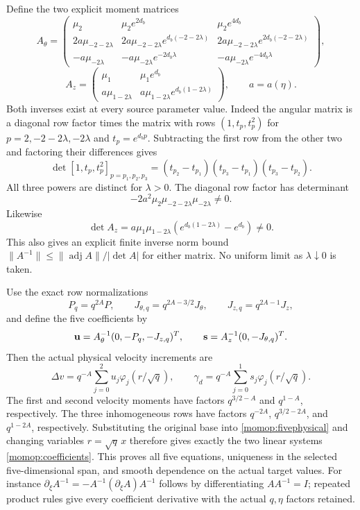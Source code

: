\documentclass[11pt]{article}
\begin{document}
Define the two explicit moment matrices
\[
 A_\theta=
 \begin{pmatrix}
 \mu_2&\mu_2e^{2d_b}&\mu_2e^{4d_b}\\
 2a\mu_{-2-2\lambda}&
 2a\mu_{-2-2\lambda}e^{d_b(-2-2\lambda)}&
 2a\mu_{-2-2\lambda}e^{2d_b(-2-2\lambda)}\\
 -a\mu_{-2\lambda}&-a\mu_{-2\lambda}e^{-2d_b\lambda}&
                              -a\mu_{-2\lambda}e^{-4d_b\lambda}
 \end{pmatrix},
\]
\[
 A_z=
 \begin{pmatrix}
 \mu_1&\mu_1e^{d_b}\\
 a\mu_{1-2\lambda}&a\mu_{1-2\lambda}e^{d_b(1-2\lambda)}
 \end{pmatrix},\qquad a=a(\eta).
\]
Both inverses exist at every source parameter value. Indeed the
angular matrix is a diagonal row factor times the matrix with rows
$(1,t_p,t_p^2)$ for $p=2,-2-2\lambda,-2\lambda$ and
$t_p=e^{d_bp}$. Subtracting the first row from the other two
and factoring their differences gives
\[
 \det[1,t_p,t_p^2]_{p=p_1,p_2,p_3}
 =(t_{p_2}-t_{p_1})(t_{p_3}-t_{p_1})(t_{p_3}-t_{p_2}).
\]
All three powers are distinct for $\lambda>0$. The diagonal
row factor has determinant
\[
-2a^2\mu_2\mu_{-2-2\lambda}\mu_{-2\lambda}\ne0.
\]
Likewise
\[
\det A_z=a\mu_1\mu_{1-2\lambda}
(e^{d_b(1-2\lambda)}-e^{d_b})\ne0.
\]
This also gives an explicit finite inverse norm bound
$\|A^{-1}\|\le\|\operatorname{adj}A\|/|\det A|$
for either matrix. No uniform limit as $\lambda\downarrow0$ is taken.

Use the exact row normalizations
\[
 P_q=q^{2A}P,\qquad
 J_{\theta,q}=q^{2A-3/2}J_\theta,\qquad
 J_{z,q}=q^{2A-1}J_z,
\]
and define the five coefficients by
\begin{equation}\label{momop:coefficients}
 {\bf u}=A_\theta^{-1}(0,-P_q,-J_{z,q})^T,\qquad
 {\bf s}=A_z^{-1}(0,-J_{\theta,q})^T .
\end{equation}
Then the actual physical velocity increments are
\begin{equation}\label{momop:fiveincrement}
 \Delta v=q^{-A}\sum_{j=0}^2u_j\varphi_j(r/\sqrt q),
 \qquad
 \gamma_d=q^{-A}\sum_{j=0}^1s_j\varphi_j(r/\sqrt q).
\end{equation}
The first and second velocity moments have factors $q^{3/2-A}$
and $q^{1-A}$, respectively. The three inhomogeneous rows have
factors $q^{-2A}$, $q^{3/2-2A}$, and $q^{1-2A}$, respectively.
Substituting the original base into \eqref{momop:fivephysical}
and changing variables $r=\sqrt q\,x$ therefore gives exactly
the two linear systems \eqref{momop:coefficients}. This proves all
five equations, uniqueness in the selected five-dimensional span,
and smooth dependence on the actual target values. For instance
$\partial_\xi A^{-1}=-A^{-1}(\partial_\xi A)A^{-1}$ follows by
differentiating $AA^{-1}=I$; repeated product rules give every
coefficient derivative with the actual $q,\eta$ factors retained.
\end{document}
